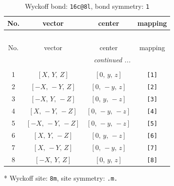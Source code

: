 \documentclass[fleqn,8pt]{jsarticle}
\begin{document}
\begin{longtable}{cccc}
\caption{Wyckoff bond: {\tt 16c@8l}, bond symmetry: {\tt 1}}
 \\
 \hline \hline
No. & vector & center & mapping \\ \hline \endfirsthead

\multicolumn{3}{l}{\tablename\ \thetable{}} \\
 \hline \hline
No. & vector & center & mapping \\ \hline \endhead

 \hline \hline
\multicolumn{3}{r}{\footnotesize\it continued ...} \\ \endfoot

 \hline \hline
\multicolumn{3}{r}{} \\ \endlastfoot

1 & $\left[ X,\, Y,\, Z \right]$ & $\left[ 0,\, y,\, z \right]$ & {\tt [1]} \\ \hline
2 & $\left[ - X,\, - Y,\, Z \right]$ & $\left[ 0,\, - y,\, z \right]$ & {\tt [2]} \\ \hline
3 & $\left[ - X,\, Y,\, - Z \right]$ & $\left[ 0,\, y,\, - z \right]$ & {\tt [3]} \\ \hline
4 & $\left[ X,\, - Y,\, - Z \right]$ & $\left[ 0,\, - y,\, - z \right]$ & {\tt [4]} \\ \hline
5 & $\left[ - X,\, - Y,\, - Z \right]$ & $\left[ 0,\, - y,\, - z \right]$ & {\tt [5]} \\ \hline
6 & $\left[ X,\, Y,\, - Z \right]$ & $\left[ 0,\, y,\, - z \right]$ & {\tt [6]} \\ \hline
7 & $\left[ X,\, - Y,\, Z \right]$ & $\left[ 0,\, - y,\, z \right]$ & {\tt [7]} \\ \hline
8 & $\left[ - X,\, Y,\, Z \right]$ & $\left[ 0,\, y,\, z \right]$ & {\tt [8]} \\
\end{longtable}
* Wyckoff site: {\tt 8m}, site symmetry: {\tt .m.}
\renewcommand{\arraystretch}{1.2}
\end{document}

